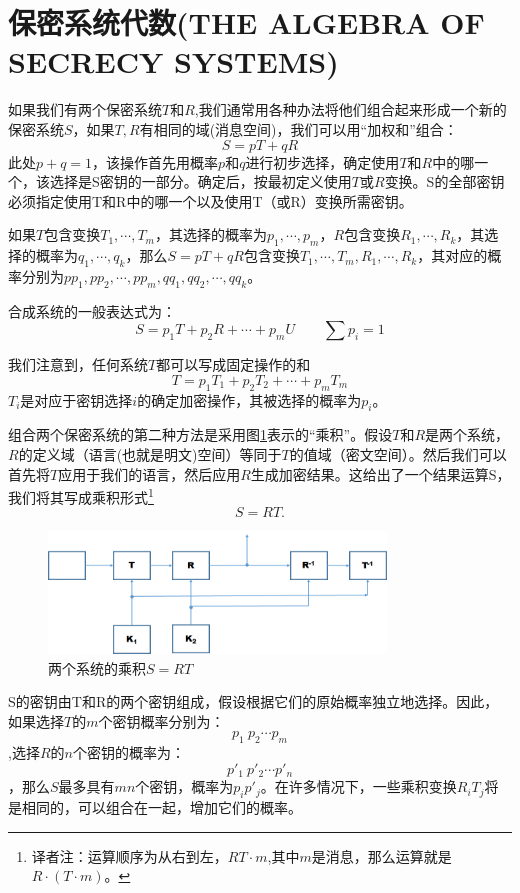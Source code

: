 \documentclass[]{article}
\begin{document}
\section{保密系统代数(THE ALGEBRA OF SECRECY SYSTEMS)}
如果我们有两个保密系统$T$和$R$,我们通常用各种办法将他们组合起来形成一个新的保密系统$S$，如果$T,R$有相同的域(消息空间)，我们可以用“加权和”组合：
\[S=pT+qR\]
此处$p+q=1$，该操作首先用概率$p$和$q$进行初步选择，确定使用$T$和$R$中的哪一个，该选择是S密钥的一部分。确定后，按最初定义使用$T$或$R$变换。S的全部密钥必须指定使用T和R中的哪一个以及使用T（或R）变换所需密钥。

如果$T$包含变换$T_1,\cdots,T_m$，其选择的概率为$p_1,\cdots,p_m$，$R$包含变换$R_1,\cdots,R_k$，其选择的概率为$q_1,\cdots,q_k$，那么$S=pT+qR$包含变换$T_1,\cdots,T_m,R_1,\cdots,R_k$，其对应的概率分别为$pp_1,pp_2,\cdots,pp_m,qq_1,qq_2,\cdots,qq_k$。

合成系统的一般表达式为：
\[S=p_1T+p_2R+\cdots+p_mU \qquad \sum p_i=1\]

我们注意到，任何系统$T$都可以写成固定操作的和
\[T=p_1T_1+p_2T_2+\cdots+p_mT_m\]
$T_i$是对应于密钥选择$i$的确定加密操作，其被选择的概率为$p_i$。

组合两个保密系统的第二种方法是采用图\ref{Fig:fig3}表示的“乘积”。假设$T$和$R$是两个系统，$R$的定义域（语言(也就是明文)空间）等同于$T$的值域（密文空间）。然后我们可以首先将$T$应用于我们的语言，然后应用$R$生成加密结果。这给出了一个结果运算S，我们将其写成乘积形式\footnote{译者注：运算顺序为从右到左，$RT\cdot m$,其中$m$是消息，那么运算就是$R\cdot (T \cdot m)$。}
\[S=RT.\]

\begin{figure}[htbp]
	\centering
	\includegraphics[width=0.8\textwidth]{fig3.png}
	\caption{两个系统的乘积$S=RT$}
	\label{Fig:fig3}
\end{figure}

S的密钥由T和R的两个密钥组成，假设根据它们的原始概率独立地选择。因此，如果选择$T$的$m$个密钥概率分别为：
\[p_1\ p_2\cdots p_m\]
,选择$R$的$n$个密钥的概率为：
\[p'_1\ p'_2\cdots p'_n\]
 ，那么$S$最多具有$mn$个密钥，概率为$p_ip'_j$。在许多情况下，一些乘积变换$R_iT_j$将是相同的，可以组合在一起，增加它们的概率。
\end{document}
